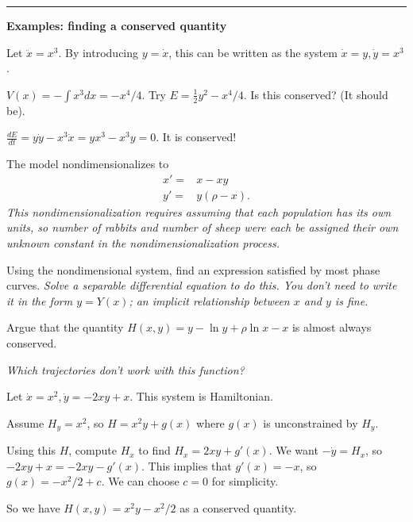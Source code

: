 \documentclass[12pt,letterpaper,noanswers]{exam}
\begin{document}
\vspace{0.2cm}
\hrule
\vspace{0.2cm}

\noindent\textbf{Examples: finding a conserved quantity}

\begin{questions}
\item Let $\ddot x = x^3$.  By introducing $y = \dot x$, this can be written as the system $\dot x = y, \dot y = x^3$.

$V(x) = -\int x^3 dx = -x^4/4$.  Try $E = \frac{1}{2}y^2 - x^4/4$.  Is this conserved?  (It should be).

$\frac{dE}{dt} = y\dot y - x^3\dot x = yx^3 - x^3y = 0$.  It is conserved!

\item\begin{parts}
 \item The model nondimensionalizes to 
  \begin{align*}
 x' = & x - x y \\
 y' = &y(\rho - x).
 \end{align*}
 \emph{This nondimensionalization requires assuming that each population has its own units, so number of rabbits and number of sheep were each be assigned their own unknown constant in the nondimensionalization process.}

Using the nondimensional system, find an expression satisfied by most phase curves.  %
 \emph{Solve a separable differential equation to do this.  You don't need to write it in the form $y = Y(x)$; an implicit relationship between $x$ and $y$ is fine.}
 
 \item Argue that the quantity $H(x,y) = y - \ln y + \rho \ln x - x$ is almost always conserved.
 
 \textit{Which trajectories don't work with this function?}

\end{parts}

\item Let $\dot x = x^2, \dot y = -2xy + x$.  This system is Hamiltonian.

Assume $H_y = x^2$, so $H = x^2 y + g(x)$ where $g(x)$ is unconstrained by $H_y$.

Using this $H$, compute $H_x$ to find $H_x = 2xy + g'(x)$.  We want $-\dot y = H_x$, so $-2xy + x = -2xy - g'(x)$.  This implies that $g'(x) = -x$, so $g(x) = -x^2/2 + c$.  We can choose $c = 0$ for simplicity.

So we have $H(x,y) = x^2y - x^2/2$ as a conserved quantity.

\end{questions}
\end{document}
